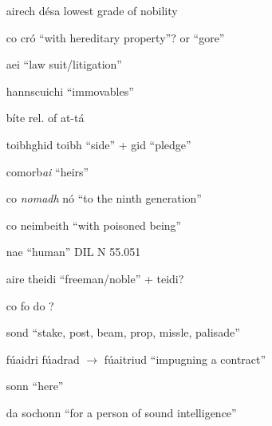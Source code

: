 \documentclass[11pt]{article}
\begin{document}
\begin{enumerate}
  \item[airech d\'{e}sa] lowest grade of nobility
  \item[co cr\'{o}] \enquote{with hereditary property}? or \enquote{gore}
  \item[aei] \enquote{law suit/litigation}
  \item[hannscuichi] \enquote{immovables}
  \item[b\'{i}te] rel. of at-t\'{a}
  \item[toibhghid] toibh \enquote{side} + gid \enquote{pledge}
  \item[comorb\emph{ai}] \enquote{heirs}
  \item[co \emph{nomadh} n\'{o}] \enquote{to the ninth generation}
  \item[co neimbeith] \enquote{with poisoned being}
  \item[nae] \enquote{human} DIL N 55.051
  \item[aire theidi] \enquote{freeman/noble} + teidi?
  \item[co fo do] ?
  \item[sond] \enquote{stake, post, beam, prop, missle, palisade}
  \item[f\'{u}aidri] f\'{u}adrad $\rightarrow$ f\'{u}aitriud \enquote{impugning a contract}
  \item[sonn] \enquote{here}
  \item[da sochonn] \enquote{for a person of sound intelligence} 
\end{enumerate}
\end{document}
